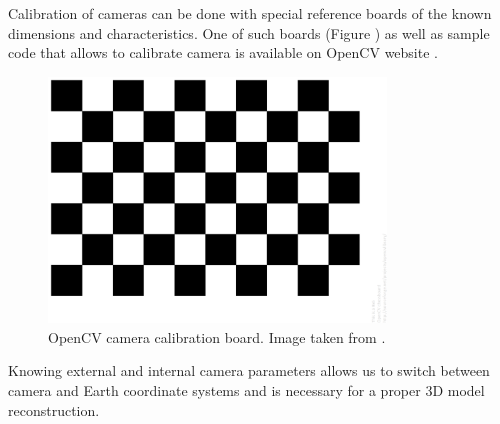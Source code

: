 Calibration of cameras can be done with special reference boards of the known dimensions and characteristics. One of such boards (Figure ) as well as sample code that allows to calibrate camera is available on OpenCV website \cite{website:cameraCalibration}.
\begin{figure}[h!]
    \centering
    \includegraphics[width=0.8\textwidth]{opencv_camera_calib}
    \caption{OpenCV camera calibration board. Image taken from \cite{website:cameraCalibration}.}
    \label{fig:camera_model}
\end{figure}
Knowing external and internal camera parameters allows us to switch between camera and Earth coordinate systems and is necessary for a proper 3D model reconstruction.
